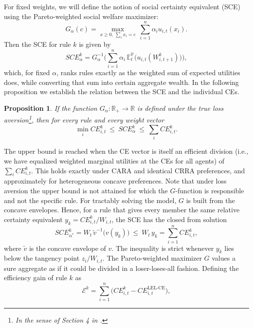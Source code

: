 \documentclass[11pt,a4paper]{article}
\theoremstyle{definition}
\theoremstyle{plain}
\newtheorem{proposition}[theorem]{Proposition}
\theoremstyle{remark}
\newcommand{\E}{\mathbb{E}}
\renewcommand{\P}{\mathbb{P}}
\newcommand{\1}{\mathbf{1}}
\begin{document}
For fixed weights, we will define the notion of social certainty equivalent (SCE) using the Pareto-weighted social welfare maximizer:
\begin{equation}
    G_{\alpha}(c)=\max_{x\ge0,\ \sum_ix_i=c}\ \sum_{i=1}^n\alpha_i u_{i,t}(x_i).
\end{equation}
Then the SCE for rule $k$ is given by
\begin{equation}
    SCE^k_{\alpha}=G_{\alpha}^{-1}\Big(\sum_{i=1}^n\alpha_i\,\E^{\P}_t\big(u_{i,t}(W^k_{i,t+1})\big)\Big),
\end{equation}
which, for fixed $\alpha$, ranks rules exactly as the weighted sum of expected utilities does, while converting that sum into certain aggregate wealth. In the following proposition we establish the relation between the SCE and the individual CEs.
\begin{proposition}
\label{Prop:SCE_relation}
    If the function $G_{\alpha}: \mathbb{R}_+ \to \mathbb{R}$ is defined under the true loss aversion\footnote{In the sense of Section 4 in \citet{Hlebarov_2026_MSc_Thesis}.}, then for every rule and every weight vector
    \begin{equation*}
        \min_iCE^k_{i,t}\ \le\ SCE^k_\alpha\ \le\ \sum_iCE^k_{i,t}.
    \end{equation*}
\end{proposition}
The upper bound is reached when the CE vector is itself an efficient division (i.e., we have equalized weighted marginal utilities at the CEs for all agents) of $\sum_i CE_{i,t}^k$. This holds exactly under CARA \citep{Wilson1968} and identical CRRA preferences, and approximately for heterogeneous concave preferences. Note that under loss aversion the upper bound is not attained for which the $G$-function is responsible and not the specific rule. For tractably solving the model, $G$ is built from the concave envelopes. Hence, for a rule that gives every member the same relative certainty equivalent $y_k = CE_{i,t}^k/W_{i,t}$, the SCE has the closed from solution
\begin{equation}
    \label{eq:SCE_gap}
    SCE^k_{\alpha^*}=W_t\,\tilde v^{-1}\big(v(y_k)\big)\ \le\ W_t\,y_k=\sum_{i=1}^n CE^k_{i,t},
\end{equation}
where $\tilde{v}$ is the concave envelope of $v$. The inequality is strict whenever $y_k$ lies below the tangency point $z_i/W_{i,t}$. The Pareto-weighted maximizer $G$ values a sure aggregate as if it could be divided in a loser-loses-all fashion. Defining the efficiency gain of rule $k$ as
\begin{equation*}
    \mathcal{E}^k=\sum_{i=1}^n\big(CE^k_{i,t}-CE^{\text{LEL-CE}}_{i,t}\big),
\end{equation*}
\end{document}
